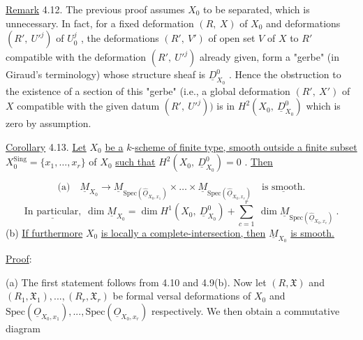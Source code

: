 \underline{Remark} 4.12.  The previous proof assumes  $X_0$  to be separated, which is unnecessary. In fact, for a fixed deformation  $(R,\ X)$  of  $X_0$  and deformations  $(R',\ U'^j)$  of $U_0^j$ , the deformations  $(R',\ V')$  of open set  $V$  of  $X$  to  $R'$  compatible with the deformation  $(R',\ U'^j)$  already given, form a  "gerbe"  (in Giraud's terminology) whose structure sheaf is  $\underline{D}^0_{X_0}$ . Hence the obstruction to the existence of a section of this  "gerbe"  (i.e., a global deformation  $(R',\ X')$  of  $X$  compatible with the given datum  $(R',\ U'^j))$  is in $H^2(X_0,\ \underline{D}^0_{X_0})$  which is zero by assumption.

\underline{Corollary} 4.13.  \underline{Let}  $X_0$  \underline{be a} $k$-\underline{scheme of finite type, smooth outside a finite subset}  $X_0^{\mathrm{Sing}} = \{x_1,\dots,x_r\}$  of  $X_0$  \underline{such that}  $H^2(X_0,\ \underline{D}^0_{X_0}) = 0$ . \underline{Then}

$$\text{(a)}\quad \underline{M}_{X_0} \to \underline{M}_{\mathrm{Spec}(\widehat{\underline{O}}_{X_0,x_1})} \times\dots\times \underline{M}_{\mathrm{Spec}(\widehat{\underline{O}}_{X_0,x_r})}\quad \underline{\text{is smooth.}}$$
$$\underline{\text{In particular,}}\ \ \dim \underline{M}_{X_0} = \dim H^1(X_0,\ \underline{D}^0_{X_0}) + \sum_{c=1}^{r} \ \dim \underline{M}_{\mathrm{Spec}(\widehat{\underline{O}}_{X_0,x_c})}\ .$$
(b)  \underline{If furthermore}  $X_0$  \underline{is locally a complete-intersection, then}  $\underline{M}_{X_0}$ \underline{is smooth.}


\underline{Proof}:

(a)  The first statement follows from 4.10 and 4.9(b). Now let  $(R, \mathfrak{X})$  and  $(R_1, \mathfrak{X}_1),...,(R_r, \mathfrak{X}_r)$  be formal versal deformations of  $X_0$  and  $\mathrm{Spec}(\underline{O}_{X_0,x_1}),...,\mathrm{Spec}(\underline{O}_{X_0,x_r})$  respectively. We then obtain a commutative diagram

